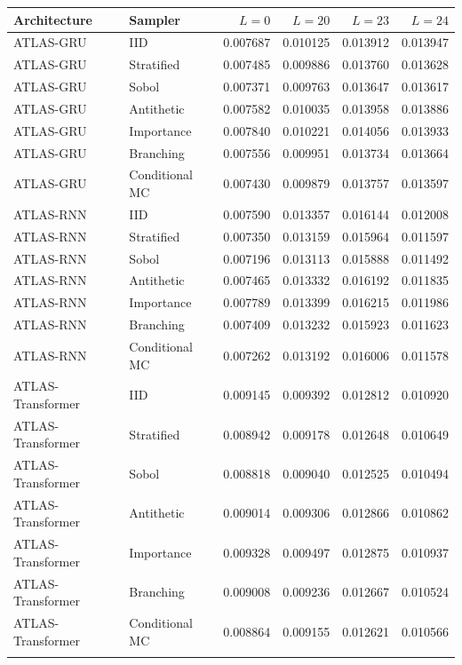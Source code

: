 \begin{center}\begin{minipage}{\textwidth}\centering\small
\begin{tabular}{llrrrr}
\toprule
Architecture & Sampler & $L=0$ & $L=20$ & $L=23$ & $L=24$ \\\midrule
ATLAS-GRU & IID & 0.007687 & 0.010125 & 0.013912 & 0.013947 \\
ATLAS-GRU & Stratified & 0.007485 & 0.009886 & 0.013760 & 0.013628 \\
ATLAS-GRU & Sobol & 0.007371 & 0.009763 & 0.013647 & 0.013617 \\
ATLAS-GRU & Antithetic & 0.007582 & 0.010035 & 0.013958 & 0.013886 \\
ATLAS-GRU & Importance & 0.007840 & 0.010221 & 0.014056 & 0.013933 \\
ATLAS-GRU & Branching & 0.007556 & 0.009951 & 0.013734 & 0.013664 \\
ATLAS-GRU & Conditional MC & 0.007430 & 0.009879 & 0.013757 & 0.013597 \\
\addlinespace
ATLAS-RNN & IID & 0.007590 & 0.013357 & 0.016144 & 0.012008 \\
ATLAS-RNN & Stratified & 0.007350 & 0.013159 & 0.015964 & 0.011597 \\
ATLAS-RNN & Sobol & 0.007196 & 0.013113 & 0.015888 & 0.011492 \\
ATLAS-RNN & Antithetic & 0.007465 & 0.013332 & 0.016192 & 0.011835 \\
ATLAS-RNN & Importance & 0.007789 & 0.013399 & 0.016215 & 0.011986 \\
ATLAS-RNN & Branching & 0.007409 & 0.013232 & 0.015923 & 0.011623 \\
ATLAS-RNN & Conditional MC & 0.007262 & 0.013192 & 0.016006 & 0.011578 \\
\addlinespace
ATLAS-Transformer & IID & 0.009145 & 0.009392 & 0.012812 & 0.010920 \\
ATLAS-Transformer & Stratified & 0.008942 & 0.009178 & 0.012648 & 0.010649 \\
ATLAS-Transformer & Sobol & 0.008818 & 0.009040 & 0.012525 & 0.010494 \\
ATLAS-Transformer & Antithetic & 0.009014 & 0.009306 & 0.012866 & 0.010862 \\
ATLAS-Transformer & Importance & 0.009328 & 0.009497 & 0.012875 & 0.010937 \\
ATLAS-Transformer & Branching & 0.009008 & 0.009236 & 0.012667 & 0.010524 \\
ATLAS-Transformer & Conditional MC & 0.008864 & 0.009155 & 0.012621 & 0.010566 \\
\addlinespace
\bottomrule\end{tabular}
\end{minipage}\end{center}